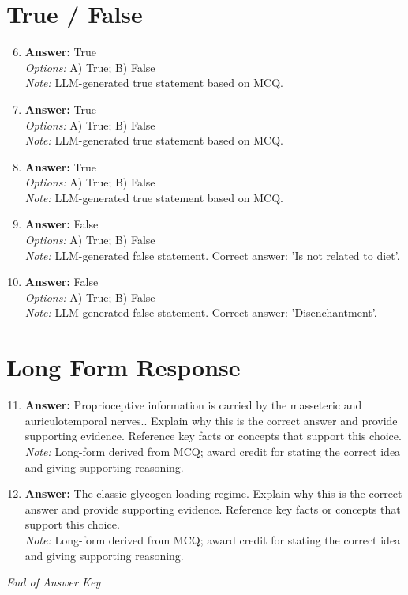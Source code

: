 \documentclass[12pt]{article}
\begin{document}
\section*{True / False}
\begin{enumerate}[label=\arabic*.]
\setcounter{enumi}{5}
\item \textbf{Answer:} True
\\ \textit{Options:} A) True; B) False
\\ \textit{Note:} LLM-generated true statement based on MCQ.
\item \textbf{Answer:} True
\\ \textit{Options:} A) True; B) False
\\ \textit{Note:} LLM-generated true statement based on MCQ.
\item \textbf{Answer:} True
\\ \textit{Options:} A) True; B) False
\\ \textit{Note:} LLM-generated true statement based on MCQ.
\item \textbf{Answer:} False
\\ \textit{Options:} A) True; B) False
\\ \textit{Note:} LLM-generated false statement. Correct answer: 'Is not related to diet'.
\item \textbf{Answer:} False
\\ \textit{Options:} A) True; B) False
\\ \textit{Note:} LLM-generated false statement. Correct answer: 'Disenchantment'.
\end{enumerate}

\section*{Long Form Response}
\begin{enumerate}[label=\arabic*.]
\setcounter{enumi}{10}
\item \textbf{Answer:} Proprioceptive information is carried by the masseteric and auriculotemporal nerves.. Explain why this is the correct answer and provide supporting evidence. Reference key facts or concepts that support this choice.
\\ \textit{Note:} Long-form derived from MCQ; award credit for stating the correct idea and giving supporting reasoning.
\item \textbf{Answer:} The classic glycogen loading regime. Explain why this is the correct answer and provide supporting evidence. Reference key facts or concepts that support this choice.
\\ \textit{Note:} Long-form derived from MCQ; award credit for stating the correct idea and giving supporting reasoning.
\end{enumerate}

\vfill
\noindent\textit{End of Answer Key}
\end{document}
